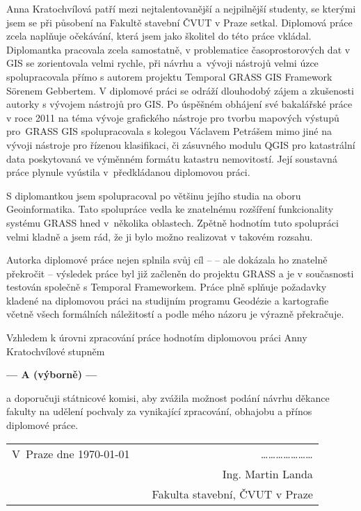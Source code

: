 \documentclass[czech,11pt,a4paper]{article}
\begin{document}
Anna Kratochvílová patří mezi nejtalentovanější a nejpilnější
studenty, se kterými jsem se při působení na Fakultě stavební ČVUT v
Praze setkal. Diplomová práce zcela naplňuje očekávání, která jsem
jako školitel do této práce vkládal. Diplomantka pracovala zcela
samostatně, v problematice časoprostorových dat v GIS se zorientovala
velmi rychle, při návrhu a~vývoji nástrojů velmi úzce spolupracovala
přímo s autorem projektu Temporal GRASS GIS Framework S\"orenem
Gebbertem. V diplomové práci se odráží dlouhodobý zájem a zkušenosti
autorky s vývojem nástrojů pro GIS. Po úspěšném obhájení své
bakalářské práce v roce 2011 na téma vývoje grafického nástroje pro
tvorbu mapových výstupů pro~GRASS GIS spolupracovala s kolegou
Václavem Petrášem mimo jiné na vývoji nástroje pro řízenou klasifikaci,
či zásuvného modulu QGIS pro katastrální data poskytovaná ve výměnném
formátu katastru nemovitostí. Její soustavná práce plynule vyústila
v~předkládanou diplomovou práci.

S diplomantkou jsem spolupracoval po většinu jejího studia na oboru
Geoinformatika. Tato spolupráce vedla ke znatelnému rozšíření
funkcionality systému GRASS hned v~několika oblastech. Zpětně hodnotím
tuto spolupráci velmi kladně a jsem rád, že ji bylo možno realizovat v
takovém rozsahu. \newpage

Autorka diplomové práce nejen splnila svůj cíl --  -- ale
dokázala ho znatelně překročit -- výsledek práce byl již začleněn do
projektu GRASS a je v současnosti testován společně s Temporal
Frameworkem. Práce plně splňuje požadavky kladené na diplomovou práci
na studijním programu Geodézie a kartografie včetně všech formálních
náležitostí a podle mého názoru je výrazně překračuje.

Vzhledem k úrovni zpracování práce hodnotím diplomovou práci Anny
Kratochvílové stupněm

\begin{center}
{\bf --- A (výborně)  ---}
\end{center}

a doporučuji státnicové komisi, aby zvážila možnost podání návrhu
děkance fakulty na udělení pochvaly za vynikající zpracování, obhajobu
a přínos diplomové práce.

\vspace{2cm}

\noindent \begin{tabular}{lp{}r}
V~Praze dne \today & & \ldots\ldots\ldots\ldots\ldots\ldots\ldots \\
& & Ing. Martin Landa \\
& & Fakulta stavební, ČVUT v Praze \\
\end{tabular}
\end{document}
